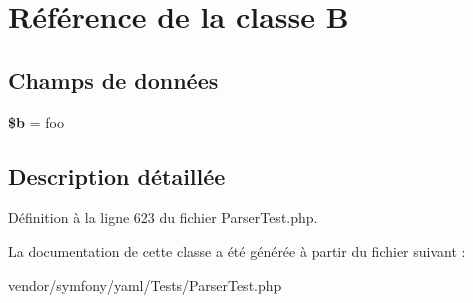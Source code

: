 \hypertarget{class_symfony_1_1_component_1_1_yaml_1_1_tests_1_1_b}{}\section{Référence de la classe B}
\label{class_symfony_1_1_component_1_1_yaml_1_1_tests_1_1_b}
\subsection*{Champs de données}
\begin{DoxyCompactItemize}
\item 
{\bfseries \$b} = \textquotesingle{}foo\textquotesingle{}\hypertarget{class_symfony_1_1_component_1_1_yaml_1_1_tests_1_1_b_ab9eb087b791749ae45deabb0899b7ccc}{}\label{class_symfony_1_1_component_1_1_yaml_1_1_tests_1_1_b_ab9eb087b791749ae45deabb0899b7ccc}

\end{DoxyCompactItemize}


\subsection{Description détaillée}


Définition à la ligne 623 du fichier Parser\+Test.\+php.



La documentation de cette classe a été générée à partir du fichier suivant \+:\begin{DoxyCompactItemize}
\item 
vendor/symfony/yaml/\+Tests/Parser\+Test.\+php\end{DoxyCompactItemize}
